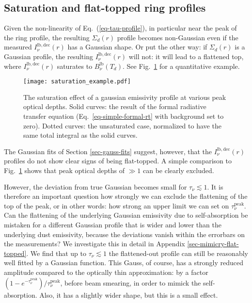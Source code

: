 \documentclass{aa}
\begin{document}
\subsection{Saturation and flat-topped ring profiles}
\label{sec-saturation-flat-top-profiles}
%
Given the non-linearity of Eq.~(\ref{eq-tau-profile}), in particular near
the peak of the ring profile, the resulting $\Sigma_d(r)$ profile becomes
non-Gaussian even if the measured $I_\nu^{\mathrm{lb,dec}}(r)$ has a Gaussian
shape. Or put the other way: if $\Sigma_d(r)$ is a Gaussian profile, the
resulting $I_\nu^{\mathrm{lb,dec}}(r)$ will not: it will lead to a flattened
top, where $I_\nu^{\mathrm{lb,dec}}(r)$ saturates to $B_\nu^{\mathrm{lb}}(T_d)$.
See Fig.~\ref{fig-flat-topped} for a quantitative example.

\begin{figure}
  \centerline{\texttt{[image: saturation\_example.pdf]}}
  \caption{\label{fig-flat-topped}The saturation effect of a gaussian emissivity
    profile at various peak optical depths. Solid curves: the result of the
    formal radiative transfer equation (Eq.~\ref{eq-simple-formal-rt} with
    background set to zero). Dotted curves: the unsaturated case, normalized to
    have the same total integral as the solid curves.}
\end{figure}

The Gaussian fits of Section \ref{sec-gauss-fits} suggest, however, that the
$I_\nu^{\mathrm{lb,dec}}(r)$ profiles do not show clear signs of being
flat-topped. A simple comparison to Fig.~\ref{fig-flat-topped} shows that peak
optical depths of $\gg 1$ can be clearly excluded.

However, the deviation from true Gaussian becomes small for $\tau_\nu\lesssim
1$. It is therefore an important question how strongly we can exclude the
flattening of the top of the peak, or in other words: how strong an upper limit
we can set on $\tau_\nu^{\mathrm{peak}}$. Can the flattening of the underlying
Gaussian emissivity due to self-absorption be mistaken for a different Gaussian
profile that is wider and lower than the underlying dust emissivity, because the
deviations vanish within the errorbars on the measurements? We investigate this
in detail in Appendix \ref{sec-mimicry-flat-topped}. We find that up to
$\tau_\nu\lesssim 1$ the flattened-out profile can still be reasonably well
fitted by a Gaussian function. This Gauss, of course, has a strongly reduced
amplitude compared to the optically thin approximation: by a factor
$(1-e^{-\tau_\nu^{\mathrm{peak}}})/\tau_\nu^{\mathrm{peak}}$, before beam
smearing, in order to mimick the self-absorption. Also, it has a slightly wider
shape, but this is a small effect. 
\end{document}

